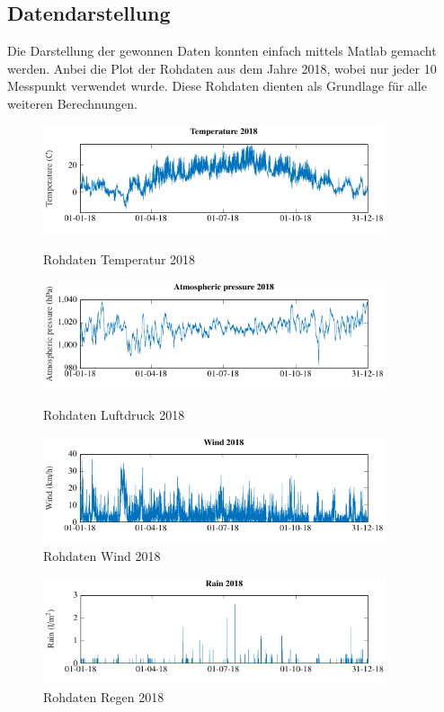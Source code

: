 \begin{refsection}
\newpage

\subsection{Datendarstellung}
Die Darstellung der gewonnen Daten konnten einfach mittels Matlab gemacht werden. Anbei die Plot der Rohdaten aus dem Jahre 2018, wobei nur jeder 10 Messpunkt verwendet wurde. Diese Rohdaten dienten als Grundlage für alle weiteren Berechnungen. 
\begin{figure}[h]
	\centering
	\includegraphics[width=0.9\textwidth]{papers/wwt/images/raw_temp_wwt.pdf}
	\caption{Rohdaten Temperatur 2018}
	\label{fig:rawdata_temp_airp}
	\includegraphics[width=0.9\textwidth]{papers/wwt/images/raw_airp_wwt.pdf}
	\caption{Rohdaten Luftdruck 2018}
	\label{fig:rawdata_temp_airp}
	\includegraphics[width=0.9\textwidth]{papers/wwt/images/raw_wind_wwt.pdf}
	\caption{Rohdaten Wind 2018}
	\label{fig:rawdata_temp_airp}
\end{figure}
\begin{figure}[h]
	\centering
	
	\includegraphics[width=0.9\textwidth]{papers/wwt/images/raw_rain_wwt.pdf}
	\caption{Rohdaten Regen 2018}
	\label{fig:rawdata_wind_rain}
\end{figure}


\end{refsection}
